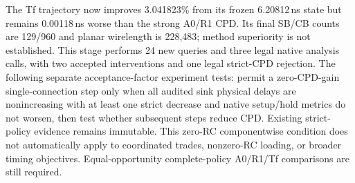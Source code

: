 The Tf trajectory now improves 3.041823\% from its frozen 6.20812\,ns state but remains 0.00118\,ns worse than the strong A0/R1 CPD. Its final SB/CB counts are 129/960 and planar wirelength is 228,483; method superiority is not established. This stage performs 24 new queries and three legal native analysis calls, with two accepted interventions and one legal strict-CPD rejection. The following separate acceptance-factor experiment tests: permit a zero-CPD-gain single-connection step only when all audited sink physical delays are nonincreasing with at least one strict decrease and native setup/hold metrics do not worsen, then test whether subsequent steps reduce CPD. Existing strict-policy evidence remains immutable. This zero-RC componentwise condition does not automatically apply to coordinated trades, nonzero-RC loading, or broader timing objectives. Equal-opportunity complete-policy A0/R1/Tf comparisons are still required.
